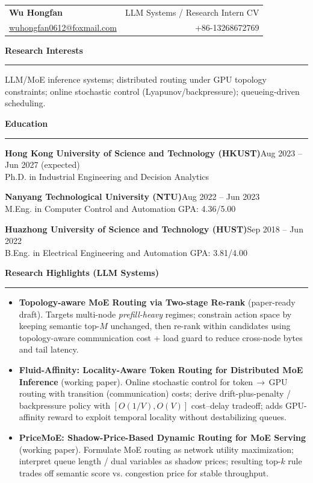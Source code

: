 \documentclass[11pt,a4paper]{article}
\newcommand{\cvsection}[1]{\vspace{2pt}\noindent\textbf{\large #1}\\[-2pt]\textcolor{cvgray}{\rule{\linewidth}{0.4pt}}\vspace{2pt}}
\newcommand{\cvname}[1]{{\huge\textbf{#1}}}
\newcommand{\cvitem}[2]{\textbf{#1}\hfill \textcolor{cvgray}{#2}\\}
\newcommand{\cvsmall}{\fontsize{10pt}{12pt}\selectfont}
\begin{document}
\cvsmall

\begin{tabularx}{\linewidth}{@{}X r@{}}
\cvname{Wu Hongfan} & \textcolor{cvgray}{LLM Systems / Research Intern CV}\\[-1pt]
\href{mailto:wuhongfan0612@foxmail.com}{wuhongfan0612@foxmail.com} & +86-13268672769\\
\end{tabularx}

\vspace{6pt}

\cvsection{Research Interests}
LLM/MoE inference systems; distributed routing under GPU topology constraints; online stochastic control (Lyapunov/backpressure); queueing-driven scheduling.

\cvsection{Education}
\cvitem{Hong Kong University of Science and Technology (HKUST)}{Aug 2023 -- Jun 2027 (expected)}
Ph.D. in Industrial Engineering and Decision Analytics

\cvitem{Nanyang Technological University (NTU)}{Aug 2022 -- Jun 2023}
M.Eng. in Computer Control and Automation \hfill GPA: 4.36/5.00

\cvitem{Huazhong University of Science and Technology (HUST)}{Sep 2018 -- Jun 2022}
B.Eng. in Electrical Engineering and Automation \hfill GPA: 3.81/4.00

\cvsection{Research Highlights (LLM Systems)}
\begin{itemize}
  \item \textbf{Topology-aware MoE Routing via Two-stage Re-rank} (paper-ready draft). Targets multi-node \emph{prefill-heavy} regimes; constrain action space by keeping semantic top-$M$ unchanged, then re-rank within candidates using topology-aware communication cost + load guard to reduce cross-node bytes and tail latency.
  \item \textbf{Fluid-Affinity: Locality-Aware Token Routing for Distributed MoE Inference} (working paper). Online stochastic control for token\,$\to$\,GPU routing with transition (communication) costs; derive drift-plus-penalty / backpressure policy with $[O(1/V),O(V)]$ cost--delay tradeoff; adds GPU-affinity reward to exploit temporal locality without destabilizing queues.
  \item \textbf{PriceMoE: Shadow-Price-Based Dynamic Routing for MoE Serving} (working paper). Formulate MoE routing as network utility maximization; interpret queue length / dual variables as shadow prices; resulting top-$k$ rule trades off semantic score vs. congestion price for stable throughput.
\end{itemize}
\end{document}
